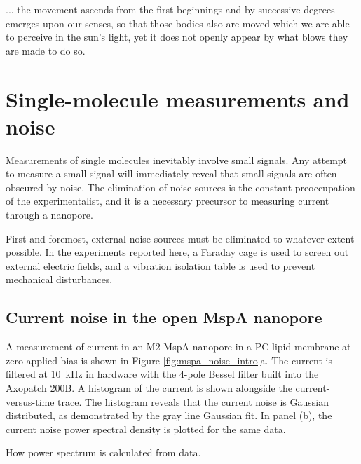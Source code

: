 \begin{savequote}[75mm]
... the movement ascends from the first-beginnings and by successive degrees emerges upon our senses, so that those bodies also are moved which we are able to perceive in the sun's light, yet it does not openly appear by what blows they are made to do so.
\end{savequote}

\chapter{Single-molecule measurements and noise}
\label{thermal_motion}

Measurements of single molecules inevitably involve small signals.  Any attempt to measure a small signal will immediately reveal that small signals are often obscured by noise.  The elimination of noise sources is the constant preoccupation of the experimentalist, and it is a necessary precursor to measuring current through a nanopore.

First and foremost, external noise sources must be eliminated to whatever extent possible.  In the experiments reported here, a Faraday cage is used to screen out external electric fields, and a vibration isolation table is used to prevent mechanical disturbances.

\section{Current noise in the open MspA nanopore}

A measurement of current in an M2-MspA nanopore in a PC lipid membrane at zero applied bias is shown in Figure \ref{fig:mspa_noise_intro}a.  The current is filtered at \SI{10}{\kHz} in hardware with the 4-pole Bessel filter built into the Axopatch 200B.  A histogram of the current is shown alongside the current-versus-time trace.  The histogram reveals that the current noise is Gaussian distributed, as demonstrated by the gray line Gaussian fit.  In panel (b), the current noise power spectral density is plotted for the same data.

How power spectrum is calculated from data.

